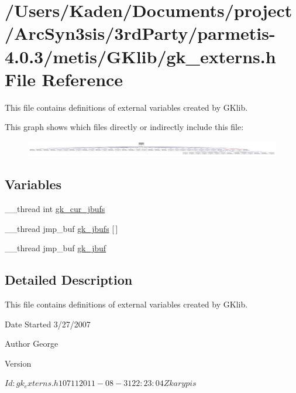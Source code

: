 \hypertarget{a00047}{}\section{/\+Users/\+Kaden/\+Documents/project/\+Arc\+Syn3sis/3rd\+Party/parmetis-\/4.0.3/metis/\+G\+Klib/gk\+\_\+externs.h File Reference}
\label{a00047}


This file contains definitions of external variables created by G\+Klib.  


This graph shows which files directly or indirectly include this file\+:\nopagebreak
\begin{figure}[H]
\begin{center}
\leavevmode
\includegraphics[width=350pt]{a00049}
\end{center}
\end{figure}
\subsection*{Variables}
\begin{DoxyCompactItemize}
\item 
\+\_\+\+\_\+thread int \hyperlink{a00047_a4977ceba83d44d803185a470184ce54c}{gk\+\_\+cur\+\_\+jbufs}
\item 
\+\_\+\+\_\+thread jmp\+\_\+buf \hyperlink{a00047_ab371a33f6ef660f6c8192c47a5acb5f0}{gk\+\_\+jbufs} \mbox{[}$\,$\mbox{]}
\item 
\+\_\+\+\_\+thread jmp\+\_\+buf \hyperlink{a00047_abb27fc6bbc48966df357e149f5b6841f}{gk\+\_\+jbuf}
\end{DoxyCompactItemize}


\subsection{Detailed Description}
This file contains definitions of external variables created by G\+Klib. 

\begin{DoxyDate}{Date}
Started 3/27/2007 
\end{DoxyDate}
\begin{DoxyAuthor}{Author}
George 
\end{DoxyAuthor}
\begin{DoxyVersion}{Version}
\begin{DoxyVerb}$Id: gk_externs.h 10711 2011-08-31 22:23:04Z karypis $ \end{DoxyVerb}
 
\end{DoxyVersion}


